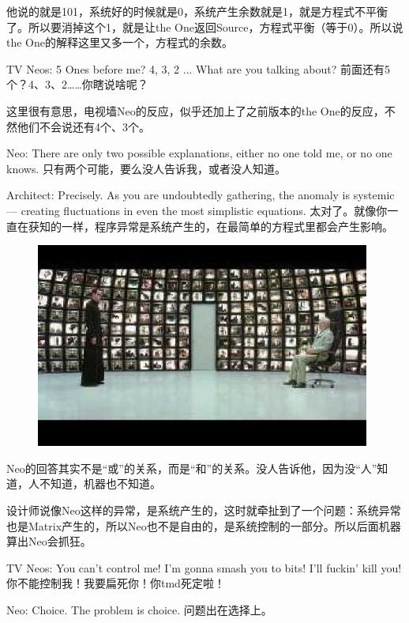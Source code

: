 \documentclass{ctexart}
\begin{document}
他说的就是101，系统好的时候就是0，系统产生余数就是1，就是方程式不平衡了。所以要消掉这个1，就是让the One返回Source，方程式平衡（等于0）。所以说the One的解释这里又多一个，方程式的余数。

TV Neos: 5 Ones before me? 4, 3, 2 ... What are you talking about? 前面还有5个？4、3、2……你瞎说啥呢？

这里很有意思，电视墙Neo的反应，似乎还加上了之前版本的the One的反应，不然他们不会说还有4个、3个。

Neo: There are only two possible explanations, either no one told me, or no one knows. 只有两个可能，要么没人告诉我，或者没人知道。

Architect: Precisely. As you are undoubtedly gathering, the anomaly is systemic --- creating fluctuations in even the most simplistic equations. 太对了。就像你一直在获知的一样，程序异常是系统产生的，在最简单的方程式里都会产生影响。

\begin{figure}[htb]
\centering
\includegraphics[width=0.5\linewidth]{fig/read_reloaded-161}
\end{figure}

Neo的回答其实不是“或”的关系，而是“和”的关系。没人告诉他，因为没“人”知道，人不知道，机器也不知道。

设计师说像Neo这样的异常，是系统产生的，这时就牵扯到了一个问题：系统异常也是Matrix产生的，所以Neo也不是自由的，是系统控制的一部分。所以后面机器算出Neo会抓狂。

TV Neos: You can’t control me! I’m gonna smash you to bits! I’ll fuckin’ kill you! 你不能控制我！我要扁死你！你tmd死定啦！

Neo: Choice. The problem is choice. 问题出在选择上。
\end{document}
